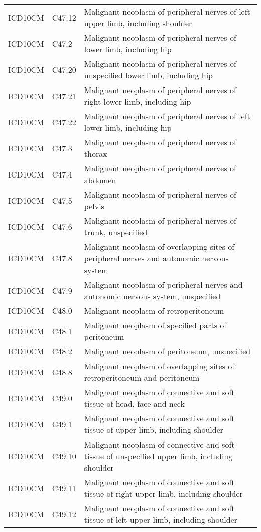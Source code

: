 \begin{longtable}{p{}p{}p{}}
  ICD10CM & C47.12 & Malignant neoplasm of peripheral nerves of left upper limb, including shoulder \\ 
  ICD10CM & C47.2 & Malignant neoplasm of peripheral nerves of lower limb, including hip \\ 
  ICD10CM & C47.20 & Malignant neoplasm of peripheral nerves of unspecified lower limb, including hip \\ 
  ICD10CM & C47.21 & Malignant neoplasm of peripheral nerves of right lower limb, including hip \\ 
  ICD10CM & C47.22 & Malignant neoplasm of peripheral nerves of left lower limb, including hip \\ 
  ICD10CM & C47.3 & Malignant neoplasm of peripheral nerves of thorax \\ 
  ICD10CM & C47.4 & Malignant neoplasm of peripheral nerves of abdomen \\ 
  ICD10CM & C47.5 & Malignant neoplasm of peripheral nerves of pelvis \\ 
  ICD10CM & C47.6 & Malignant neoplasm of peripheral nerves of trunk, unspecified \\ 
  ICD10CM & C47.8 & Malignant neoplasm of overlapping sites of peripheral nerves and autonomic nervous system \\ 
  ICD10CM & C47.9 & Malignant neoplasm of peripheral nerves and autonomic nervous system, unspecified \\ 
  ICD10CM & C48.0 & Malignant neoplasm of retroperitoneum \\ 
  ICD10CM & C48.1 & Malignant neoplasm of specified parts of peritoneum \\ 
  ICD10CM & C48.2 & Malignant neoplasm of peritoneum, unspecified \\ 
  ICD10CM & C48.8 & Malignant neoplasm of overlapping sites of retroperitoneum and peritoneum \\ 
  ICD10CM & C49.0 & Malignant neoplasm of connective and soft tissue of head, face and neck \\ 
  ICD10CM & C49.1 & Malignant neoplasm of connective and soft tissue of upper limb, including shoulder \\ 
  ICD10CM & C49.10 & Malignant neoplasm of connective and soft tissue of unspecified upper limb, including shoulder \\ 
  ICD10CM & C49.11 & Malignant neoplasm of connective and soft tissue of right upper limb, including shoulder \\ 
  ICD10CM & C49.12 & Malignant neoplasm of connective and soft tissue of left upper limb, including shoulder \\ 

\end{longtable}
